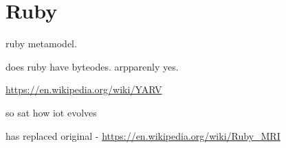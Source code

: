 \section{Ruby}

ruby metamodel.



does ruby have byteodes.
arpparenly yes.

\url{https://en.wikipedia.org/wiki/YARV}

so sat how iot evolves

has replaced original - \url{https://en.wikipedia.org/wiki/Ruby_MRI}
